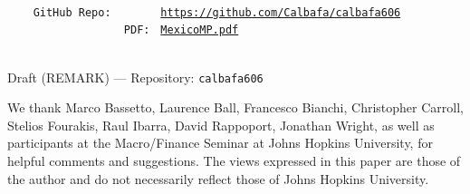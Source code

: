 \documentclass[\latexroot/\projectname]{subfiles}
\begin{document}
\whenintegrated{\label{links}} %

\providecommand{\REMARK}{\href{https://github.com/econ-ark/REMARK}{REMARK}}
\begin{footnotesize}
  \setlength{\parskip}{0pt}
  \parbox{0.9\textwidth}{
    \begin{tabbing}
      \texttt{~~~~~~~~~~~~~~~~~~~~~~~} \= \= \\
      \texttt{~~~~GitHub~Repo:~~~~~~~} \> \> \texttt{\href{https://github.com/Calbafa/calbafa606}{https://github.com/Calbafa/calbafa606}} \\
      \texttt{~~~~~~~~~~~~~~~~~~PDF:~} \> \> \texttt{\href{https://github.com/Calbafa/calbafa606/blob/main/MexicoMP.pdf}{MexicoMP.pdf}} \\
      \texttt{~~~~~~~~~~~~~~~~~~~~~~~} \> \> \\
    \end{tabbing}
  } %
\end{footnotesize}
\vspace{-0.3\baselineskip}

\centerline{Draft (REMARK) — Repository: \texttt{calbafa606}}
\vspace{-0.3\baselineskip}

\begin{authorsinfo}
  \noindent {}
\end{authorsinfo}


\newcommand{\thanksInput}[1]{%
  \IfFileExists{\latexroot/Subfiles/#1.tex}%
  {\ignorespaces\unskip}%
  {}%
}%

\whenintegrated{\label{funding-info}} %
\vspace{0.3\baselineskip}
\begin{minipage}{\textwidth}
  \footnotesize We thank Marco Bassetto, Laurence Ball, Francesco Bianchi, Christopher Carroll, Stelios Fourakis, Raul Ibarra, David Rappoport, Jonathan Wright, as well as participants at the Macro/Finance Seminar at Johns Hopkins University, for helpful comments and suggestions. The views expressed in this paper are those of the author and do not necessarily reflect those of Johns Hopkins University.
\end{minipage}

\titlepagefinish

\pdfonly{
  \captionsetup[figure]{list=no}
  \captionsetup[table]{list=no}
}

\smartbib
\end{document}
